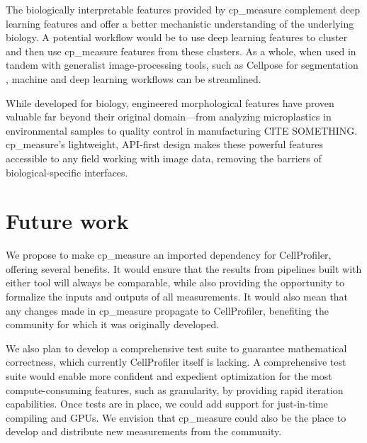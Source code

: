 \documentclass{article}
\begin{document}
The biologically interpretable features provided by cp\_measure complement deep learning features and offer a better mechanistic understanding of the underlying biology. A potential workflow would be to use deep learning features to cluster and then use cp\_measure features from these clusters. As a whole, when used in tandem with generalist image-processing tools, such as Cellpose for segmentation \cite{stringerCellposeGeneralistAlgorithm2021}, machine and deep learning workflows can be streamlined. 

While developed for biology, engineered morphological features have proven valuable far beyond their original domain—from analyzing microplastics in environmental samples \citep{ideharaExploringNileRed2025} to quality control in manufacturing CITE SOMETHING. 
cp\_measure's lightweight, API-first design makes these powerful features accessible to any field working with image data, removing the barriers of biological-specific interfaces.

\section{Future work}
\label{sec:org5cdbb12}
We propose to make cp\_measure an imported dependency for CellProfiler, offering several benefits. It would ensure that the results from pipelines built with either tool will always be comparable, while also providing the opportunity to formalize the inputs and outputs of all measurements. It would also mean that any changes made in cp\_measure propagate to CellProfiler, benefiting the community for which it was originally developed.

We also plan to develop a comprehensive test suite to guarantee mathematical correctness, which currently CellProfiler itself is lacking. A comprehensive test suite would enable more confident and expedient optimization for the most compute-consuming features, such as granularity, by providing rapid iteration capabilities. Once tests are in place, we could add support for just-in-time compiling and GPUs. We envision that cp\_measure could also be the place to develop and distribute new measurements from the community. 



\end{document}
